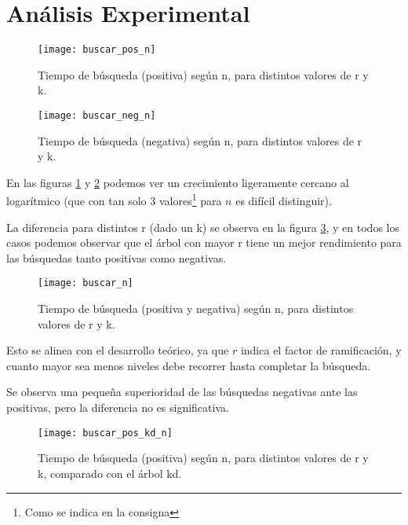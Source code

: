 \section{Análisis Experimental}

\begin{figure}
  \begin{center}
  \texttt{[image: buscar\_pos\_n]}
  \caption{Tiempo de búsqueda (positiva)
    según n, para distintos valores de r y k.}
  \label{fig:buscar-pos}
  \end{center}
\end{figure}


\begin{figure}
  \begin{center}
  \texttt{[image: buscar\_neg\_n]}
  \caption{Tiempo de búsqueda (negativa)
    según n, para distintos valores de r y k.}
  \label{fig:buscar-neg}
  \end{center}
\end{figure}

En las figuras \ref{fig:buscar-pos} y \ref{fig:buscar-neg} podemos
ver un crecimiento ligeramente cercano al logarítmico (que con tan solo 3
valores\footnote{Como se indica en la consigna} para \(n\) es difícil
distinguir).

La diferencia para distintos r (dado un k) se observa en la figura
\ref{fig:buscar}, y en todos los casos podemos observar que el árbol
con mayor r tiene un mejor rendimiento para las búsquedas tanto positivas como
negativas.

\begin{figure}
  \begin{center}
  \texttt{[image: buscar\_n]}
  \caption{Tiempo de búsqueda (positiva y negativa)
    según n, para distintos valores de r y k.}
  \label{fig:buscar}
  \end{center}
\end{figure}

Esto se alinea con el desarrollo teórico, ya que \(r\) indica el factor de
ramificación, y cuanto mayor sea menos niveles debe recorrer hasta completar la
búsqueda.

Se observa una pequeña superioridad de las búsquedas negativas ante las positivas,
pero la diferencia no es significativa.

\begin{figure}
  \begin{center}
  \texttt{[image: buscar\_pos\_kd\_n]}
  \caption{Tiempo de búsqueda (positiva)
    según n, para distintos valores de r y k, comparado con el árbol kd.}
  \label{fig:pos-kd}
  \end{center}
\end{figure}


